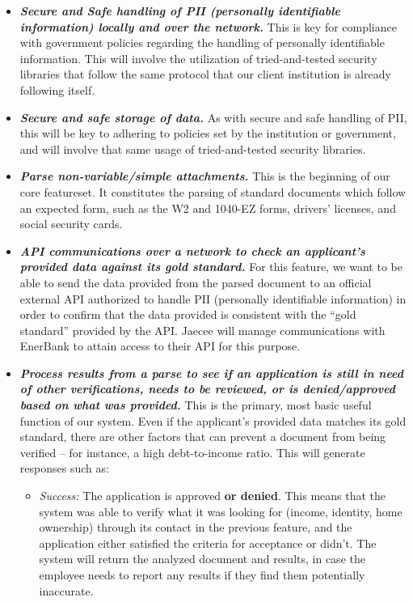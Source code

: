 \begin{itemize}[labelindent=0pt, wide]
    \item \textbf{\textit{Secure and Safe handling of PII (personally identifiable information) locally and over the network.}} This is key for compliance with government policies regarding the handling of personally identifiable information. This will involve the utilization of tried-and-tested security libraries that follow the same protocol that our client institution is already following itself.
    
    \item \textbf{\textit{Secure and safe storage of data.}} As with secure and safe handling of PII, this will be key to adhering to policies set by the institution or government, and will involve that same usage of tried-and-tested security libraries.
    
    \item \textbf{\textit{Parse non-variable/simple attachments.}} This is the beginning of our core featureset. It constitutes the parsing of standard documents which follow an expected form, such as the W2 and 1040-EZ forms, drivers' licenses, and social security cards.
    
    \item \textbf{\textit{API communications over a network to check an applicant's provided data against its gold standard.}} For this feature, we want to be able to send the data provided from the parsed document to an official external API authorized to handle PII (personally identifiable information) in order to confirm that the data provided is consistent with the ``gold standard'' provided by the API. Jaecee will manage communications with EnerBank to attain access to their API for this purpose.
    
    \item \textbf{\textit{Process results from a parse to see if an application is still in need of other verifications, needs to be reviewed, or is denied/approved based on what was provided.}} This is the primary, most basic useful function of our system. Even if the applicant's provided data matches its gold standard, there are other factors that can prevent a document from being verified -- for instance, a high debt-to-income ratio. This will generate responses such as:
    
    \begin{itemize}
        \item \textit{Success:} The application is approved \textbf{or denied}. This means that the system was able to verify what it was looking for (income, identity, home ownership) through its contact in the previous feature, and the application either satisfied the criteria for acceptance or didn't. The system will return the analyzed document and results, in case the employee needs to report any results if they find them potentially inaccurate.
        

\end{itemize}
\end{itemize}
